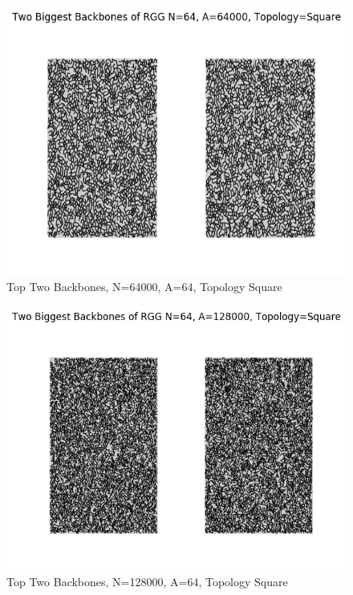 \documentclass{article}
\begin{document}
    \begin{figure}
      \centering
      \label{backbone_64_64000_Square}
      \includegraphics[width=1 \textwidth]{backbone/backbone_64_64000_Square.png}
      \caption{Top Two Backbones, N=64000, A=64, Topology Square}
    \end{figure}

    \begin{figure}
      \centering
      \label{backbone_64_128000_Square}
      \includegraphics[width=1 \textwidth]{backbone/backbone_64_128000_Square.png}
      \caption{Top Two Backbones, N=128000, A=64, Topology Square}
    \end{figure}
\end{document}
